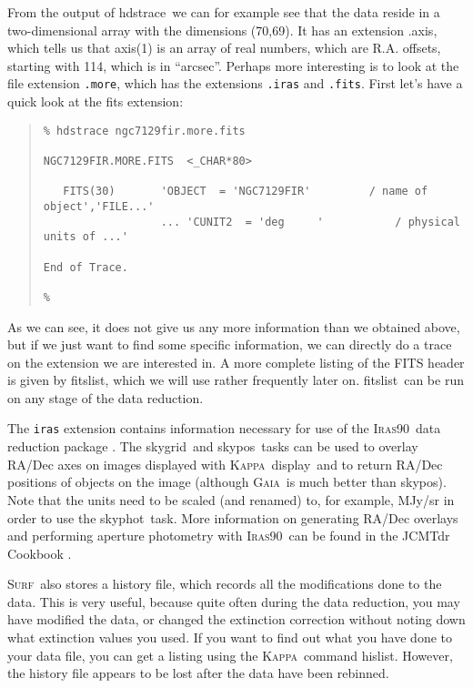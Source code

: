 \documentclass[twoside,11pt]{article}
\newenvironment{myquote}{\begin{quote}\begin{small}}{\end{small}\end{quote}}
\newcommand{\Kappa}{\xref{\textsc{Kappa}}{sun95}{}}
\newcommand{\gaia}{\xref{\textsc{Gaia}}{sun214}{}}
\newcommand{\Iras}{\xref{\textsc{Iras90}}{sun163}{}}
\newcommand{\surf}{\xref{\textsc{Surf}}{sun216}{}}
\newcommand{\task}[1]{\textsf{#1}}
\newcommand{\display}{\xref{\task{display}}{sun95}{DISPLAY}}
\newcommand{\hislist}{\xref{\task{hislist}}{sun95}{HISLIST}}
\newcommand{\fitslist}{\xref{\task{fitslist}}{sun95}{FITSLIST}}
\newcommand{\skypos}{\xref{\task{skypos}}{sun163}{SKYPOS}}
\newcommand{\skygrid}{\xref{\task{skygrid}}{sun163}{SKYGRID}}
\newcommand{\skyphot}{\xref{\task{skyphot}}{sun163}{SKYPHOT}}
\newcommand{\hdstrace}{\xref{\task{hdstrace}}{sun102}{}}
\newcommand{\xref}[3]{#1}
\begin{document}
From the output of \hdstrace\ we can for example see that the data
reside in a two-dimensional array with the dimensions (70,69). It has
an extension {.axis}, which tells us that axis(1) is an array of real
numbers, which are R.A. offsets, starting with 114, which is in
``arcsec''.  Perhaps more interesting is to look at the file extension
\texttt{.more}, which has the extensions \texttt{.iras} and
\texttt{.fits}. First let's have a quick look at the fits extension:

\begin{myquote} \begin{verbatim}
% hdstrace ngc7129fir.more.fits
 
NGC7129FIR.MORE.FITS  <_CHAR*80>
 
   FITS(30)       'OBJECT  = 'NGC7129FIR'         / name of object','FILE...'
                  ... 'CUNIT2  = 'deg     '           / physical units of ...'
 
End of Trace.
 
% 
\end{verbatim} \end{myquote}
  
As we can see, it does not give us any more information than  we
obtained above, but if we just want to find some specific information,
we can directly do a trace on the extension we are interested in. A
more complete listing of the FITS header is given by \fitslist,
which we will use rather frequently later on. \fitslist\ can
be run on any stage of the data reduction.

The \texttt{iras} extension contains information necessary
for use of the \Iras\ data reduction package \cite{iras90}. The
\skygrid\ and \skypos\ tasks can be used to overlay RA/Dec axes on images 
displayed with \Kappa\ \display\ and to return RA/Dec positions of objects on
the image (although \gaia\ is much better than \skypos).  Note that the units
need to be scaled (and renamed) to, for example, MJy/sr in order to
use the \skyphot\ task. More information on generating RA/Dec overlays
and performing aperture photometry with \Iras\ can be found in the 
\xref{JCMTdr Cookbook}{sc1}{} \cite{sc1}.


\surf\ also stores a history file, which records all the modifications done to
the data. This is very useful, because quite often during the data reduction,
you may have modified the data, or changed the extinction correction without
noting down what extinction values you used. If you want to find out what you
have done to your data file, you can get a listing using the \Kappa\ command
\hislist. However, the history file appears to be lost after the data have
been rebinned.
\end{document}

